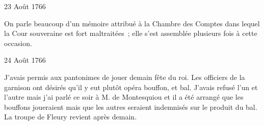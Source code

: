                      \begin{diary}{23 Août 1766}{}
                        
                         On parle beaucoup d'un mémoire attribué
                           à la Chambre des Comptes dans lequel la Cour
                              souveraine
                           est fort maltraitées ; elle s'est assemblée plusieurs
                           fois à cette occasion. \bigskip
        
        
                     \end{diary}

                     \begin{diary}{24 Août 1766}{}
                        
                         J'avais permis aux pantonimes de
                           jouer
                           demain fête du roi. Les officiers de la garnison
                           ont désirés qu'il y eut plutôt opéra bouffon,
                           et bal. J'avais refusé l'un et l'autre mais
                           j'ai parlé ce soir à M. de
                              Montesquiou
                           et il a été arrangé que les bouffons joueraient mais que les autres
                           seraient indemnisés sur
                           le produit du bal. La troupe de Fleury
                           revient après demain. \bigskip
        
        
                     \end{diary}

